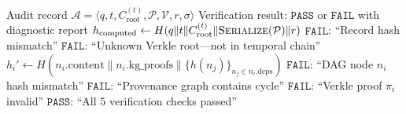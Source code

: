 \documentclass[11pt,a4paper]{article}
\begin{document}
\begin{algorithm}[H]
\caption{Independent Audit Verification of VHP Records}
\label{alg:audit_verify}
\begin{algorithmic}[1]
\REQUIRE Audit record $\mathcal{A} = \langle q, t, C_{\text{root}}^{(t)}, \mathcal{P}, \mathcal{V}, r, \sigma \rangle$
\ENSURE Verification result: $\texttt{PASS}$ or $\texttt{FAIL}$ with diagnostic report
\STATE {}
\STATE $h_{\text{computed}} \leftarrow H(q \| t \| C_{\text{root}}^{(t)} \| \textsc{Serialize}(\mathcal{P}) \| r)$
    \RETURN $\texttt{FAIL}$: ``Record hash mismatch''
\ENDIF
\STATE {}
    \RETURN $\texttt{FAIL}$: ``Unknown Verkle root---not in temporal chain''
\ENDIF
\STATE {}
    \STATE $h_i' \leftarrow H(n_i.\text{content} \| n_i.\text{kg\_proofs} \| \{h(n_j)\}_{n_j \in n_i.\text{deps}})$
        \RETURN $\texttt{FAIL}$: ``DAG node $n_i$ hash mismatch''
    \ENDIF
\ENDFOR
\STATE {}
    \RETURN $\texttt{FAIL}$: ``Provenance graph contains cycle''
\ENDIF
\STATE {}
        \RETURN $\texttt{FAIL}$: ``Verkle proof $\pi_i$ invalid''
    \ENDIF
\ENDFOR
\RETURN $\texttt{PASS}$: ``All 5 verification checks passed''
\end{algorithmic}
\end{algorithm}
\end{document}

